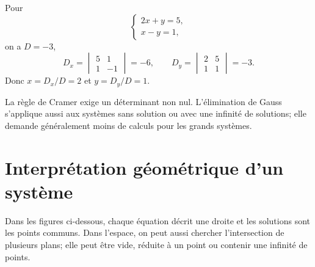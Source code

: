 \begin{examplebox}
Pour
\[
\begin{cases}
2x+y=5,\\
x-y=1,
\end{cases}
\]
on a $D=-3$,
\[
D_x=\begin{vmatrix}5&1\\1&-1\end{vmatrix}=-6,
\qquad
D_y=\begin{vmatrix}2&5\\1&1\end{vmatrix}=-3.
\]
Donc $x=D_x/D=2$ et $y=D_y/D=1$.
\end{examplebox}

\begin{warningbox}
La règle de Cramer exige un déterminant non nul. L'élimination de Gauss s'applique aussi aux systèmes sans solution ou avec une infinité de solutions; elle demande généralement moins de calculs pour les grands systèmes.
\end{warningbox}


\section{Interprétation géométrique d'un système}
\label{manual:section:12.07}

\begin{visualbox}
Dans les figures ci-dessous, chaque équation décrit une droite et les solutions sont les points communs. Dans l'espace, on peut aussi chercher l'intersection de plusieurs plans; elle peut être vide, réduite à un point ou contenir une infinité de points.
\end{visualbox}

\begin{center}
\qquad
{}
\qquad
{}
\end{center}


